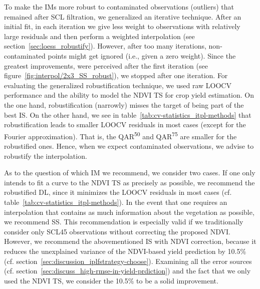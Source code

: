     To make the {{IM}}s more robust to contaminated observations (outliers) that remained after SCL filtration, we generalized an iterative technique. After an initial fit, in each iteration we give less weight to observations with relatively large residuals and then perform a weighted interpolation (see section~\ref{sec:loess_robustify}). However, after too many iterations, non-contaminated points might get ignored (i.e., given a zero weight). Since the greatest improvements, were perceived after the first iteration (see figure~\ref{fig:interpol/2x3_SS_robust}), we stopped after one iteration. 
    For evaluating the generalized robustification technique, we used raw LOOCV performance and the ability to model the NDVI TS for crop yield estimation.
    On the one hand, robustification (narrowly) misses the target of being part of the best {{IS}}. On the other hand, we see in table~\ref{tab:cv-statistics_itpl-methods} that robustification leads to smaller LOOCV residuals in most cases (except for the Fourier approximation). That is, the QAR\textsuperscript{50} and QAR\textsuperscript{75} are smaller for the robustified ones. Hence, when we expect contaminated observations, we advise to robustify the interpolation. 

As to the question of which {{IM}} we recommend, we consider two cases. If one only intends to fit a curve to the NDVI TS as precisely as possible, we recommend the robustified DL, since it minimizes the LOOCV residuals in most cases (cf. table~\ref{tab:cv-statistics_itpl-methods}). In the event that one requires an interpolation that contains as much information about the vegetation as possible, we recommend SS. This recommendation is especially valid if we traditionally consider only SCL45 observations without correcting the proposed NDVI. However, we recommend the abovementioned {{IS}} with NDVI correction, because it reduces the unexplained variance of the NDVI-based yield prediction by 10.5\% (cf. section~\ref{sec:discussion_iplfstrategy-choose}). Examining all the error sources (cf. section~\ref{sec:discuss_high-rmse-in-yield-prdiction}) and the fact that we only used the NDVI {TS}, we consider the 10.5\% to be a solid improvement.%



